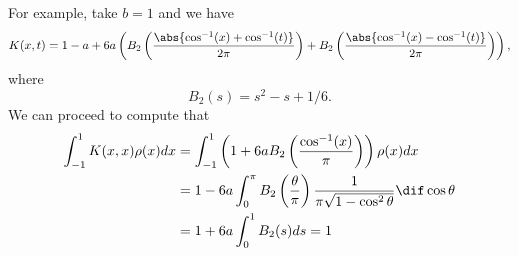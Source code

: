 \documentclass[]{elsarticle}
\theoremstyle{definition}
\begin{document}
For example, take $b=1$ and we have
$$K(x,t)=1-a+6a\left(B_2\left(\frac{\abs{\cos^{-1}(x)+\cos^{-1}(t)}}{2\pi}\right)+B_2\left(\frac{\abs{\cos^{-1}(x)-\cos^{-1}(t)}}{2\pi}\right)\right),$$
where
$$B_2(s)=s^2-s+1/6.$$
We can proceed to compute that
\begin{align*}
\int_{-1}^1K(x,x)\rho(x)dx&=\int_{-1}^1\left(1+6aB_2\left(\frac{\cos^{-1}(x)}\pi\right)\right)\rho(x)dx\\
&=1-6a\int_0^\pi B_2\left(\frac\theta\pi\right)\frac1{\pi\sqrt{1-\cos^2\theta}}\dif\cos\theta\\
&=1+6a\int_0^1 B_2(s)ds=1
\end{align*}


\end{document}
